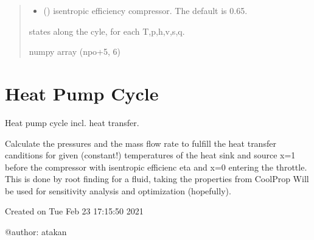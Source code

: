 \documentclass[letterpaper,10pt,english]{sphinxmanual}
\begin{document}
\begin{fulllineitems}
\begin{quote}
\begin{description}
\begin{itemize}
\item {} 
\sphinxAtStartPar
{} (\sphinxstyleliteralemphasis{\sphinxupquote{, }}) \textendash{} isentropic efficiency compressor. The default is 0.65.

\end{itemize}

\sphinxAtStartPar
states along the cyle, for each T,p,h,v,s,q.

\sphinxAtStartPar
numpy array (npo+5, 6)

\end{description}\end{quote}

\end{fulllineitems}


\sphinxstepscope


\chapter{Heat Pump Cycle}
\label{\detokenize{heat_pump_rp:module-heat_pump_rp}}\label{\detokenize{heat_pump_rp:heat-pump-cycle}}\label{\detokenize{heat_pump_rp::doc}}
\sphinxAtStartPar
Heat pump cycle incl. heat transfer.

\sphinxAtStartPar
Calculate the pressures and the mass flow rate to fulfill the heat transfer
canditions for given (constant!) temperatures of the heat sink and source
x=1 before the compressor with isentropic efficienc eta and x=0 entering
the throttle.
This is done by root finding for a fluid, taking the properties from CoolProp
Will be used for sensitivity analysis and optimization (hopefully).

\sphinxAtStartPar
Created on Tue Feb 23 17:15:50 2021

\sphinxAtStartPar
@author: atakan

\begin{fulllineitems}
\label{\detokenize{heat_pump_rp:heat_pump_rp.check_bound}}
\pysigstartsignatures
{}
\pysigstopsignatures
\end{fulllineitems}
\end{document}
